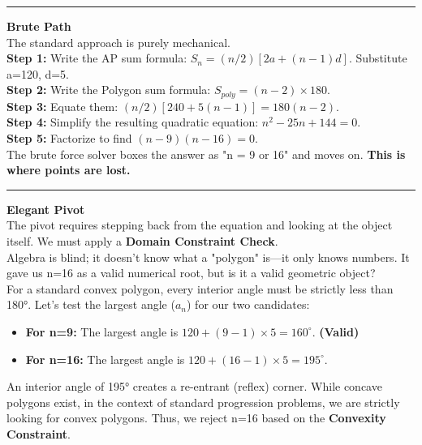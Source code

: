 \documentclass{article}
\begin{document}
\noindent \rule{\textwidth}{0.4pt}

\noindent \textbf{Brute Path} \\

\noindent The standard approach is purely mechanical. \\

\noindent \textbf{Step 1:} Write the AP sum formula: $S_n = (n/2)[2a + (n-1)d]$. Substitute a=120, d=5. \\

\noindent \textbf{Step 2:} Write the Polygon sum formula: $S_{poly} = (n-2) \times 180$. \\

\noindent \textbf{Step 3:} Equate them: $(n/2)[240 + 5(n-1)] = 180(n-2)$. \\

\noindent \textbf{Step 4:} Simplify the resulting quadratic equation: $n^2 - 25n + 144 = 0$. \\

\noindent \textbf{Step 5:} Factorize to find $(n-9)(n-16) = 0$. \\

\noindent The brute force solver boxes the answer as "n = 9 or 16" and moves on. \textbf{This is where points are lost.} \\

\noindent \rule{\textwidth}{0.4pt}

\noindent \textbf{Elegant Pivot} \\

\noindent The pivot requires stepping back from the equation and looking at the object itself. We must apply a \textbf{Domain Constraint Check}. \\

\noindent Algebra is blind; it doesn't know what a "polygon" is—it only knows numbers. It gave us n=16 as a valid numerical root, but is it a valid geometric object? \\

\noindent For a standard convex polygon, every interior angle must be strictly less than 180°. Let's test the largest angle ($a_n$) for our two candidates:
\begin{itemize}
    \item \textbf{For n=9:} The largest angle is $120 + (9-1) \times 5 = 160^\circ$. \textbf{(Valid)}
    \item \textbf{For n=16:} The largest angle is $120 + (16-1) \times 5 = 195^\circ$.
\end{itemize}
\noindent An interior angle of 195° creates a re-entrant (reflex) corner. While concave polygons exist, in the context of standard progression problems, we are strictly looking for convex polygons. Thus, we reject n=16 based on the \textbf{Convexity Constraint}. \\
\end{document}
